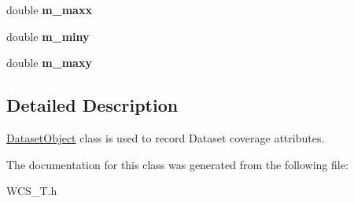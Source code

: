 \begin{DoxyCompactItemize}
\item 
\hypertarget{classDatasetObject_a74f37d10f9c59fbb1030837d61b5b9d4}{
double {\bfseries m\_\-maxx}}
\label{classDatasetObject_a74f37d10f9c59fbb1030837d61b5b9d4}

\item 
\hypertarget{classDatasetObject_a27c75b977b954eb9fde6f951147f0e45}{
double {\bfseries m\_\-miny}}
\label{classDatasetObject_a27c75b977b954eb9fde6f951147f0e45}

\item 
\hypertarget{classDatasetObject_aec36ddb711d58e94a6c88a2f6d6f8ad5}{
double {\bfseries m\_\-maxy}}
\label{classDatasetObject_aec36ddb711d58e94a6c88a2f6d6f8ad5}

\end{DoxyCompactItemize}


\subsection{Detailed Description}
\hyperlink{classDatasetObject}{DatasetObject} class is used to record Dataset coverage attributes. 

The documentation for this class was generated from the following file:\begin{DoxyCompactItemize}
\item 
WCS\_\-T.h\end{DoxyCompactItemize}
